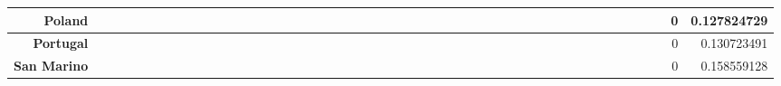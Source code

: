 \documentclass[a4paper,11pt]{report}
\begin{document}
\begin{appendices}
\begin{landscape}
\begin{longtable}{r|r|r|r|r|r|r|r|r|r|r|r|r|r|r|r|r|r|r|r|r|r|r|r|r|r|r|r|r|r|r|r|r|r|r|r|r|r|r|r|r|r|r|r|r|r|r|r|}
\multicolumn{1}{|r|}{\textbf{Poland}}                &                  &                  &                  &                     &                  &                  &                                &                   &                  &                 &                  &                  &                           &                  &                 &                  &                  &                 &                  &                  &                  &                 &                &                 &                    &                &                  &                 &                 &                   &                  &                 &                     &                 &                   &                   &                &                 &                      &                          &                 &                  &                         &                 &                & 0                        & 0.127824729        \\ \hline
\multicolumn{1}{|r|}{\textbf{Portugal}}              &                  &                  &                  &                     &                  &                  &                                &                   &                  &                 &                  &                  &                           &                  &                 &                  &                  &                 &                  &                  &                  &                 &                &                 &                    &                &                  &                 &                 &                   &                  &                 &                     &                 &                   &                   &                &                 &                      &                          &                 &                  &                         &                 &                & 0                        & 0.130723491        \\ \hline
\multicolumn{1}{|r|}{\textbf{San Marino}}            &                  &                  &                  &                     &                  &                  &                                &                   &                  &                 &                  &                  &                           &                  &                 &                  &                  &                 &                  &                  &                  &                 &                &                 &                    &                &                  &                 &                 &                   &                  &                 &                     &                 &                   &                   &                &                 &                      &                          &                 &                  &                         &                 &                & 0                        & 0.158559128        \\ \hline

\end{longtable}
\end{landscape}
\end{appendices}
\end{document}
